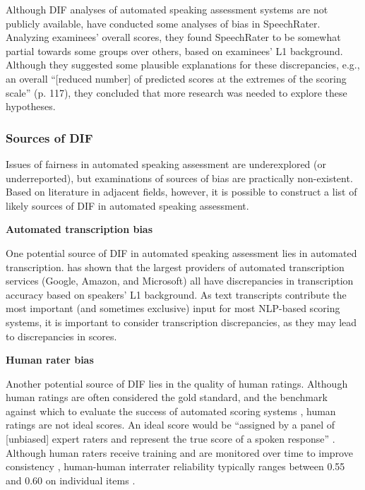 \documentclass [PhD] {uclathes}
\begin{document}
Although DIF analyses of automated speaking assessment systems are not publicly available, \citet{wang2018monitoring} have conducted some analyses of bias in SpeechRater. Analyzing examinees’ overall scores, they found SpeechRater to be somewhat partial towards some groups over others, based on examinees’ L1 background. Although they suggested some plausible explanations for these discrepancies, e.g., an overall “[reduced number] of predicted scores at the extremes of the scoring scale” (p. 117), they concluded that more research was needed to explore these hypotheses.

\subsubsection{Sources of DIF}

Issues of fairness in automated speaking assessment are underexplored (or underreported), but examinations of sources of bias are practically non-existent. Based on literature in adjacent fields, however, it is possible to construct a list of likely sources of DIF in automated speaking assessment. 

\noindent \textbf{Automated transcription bias} \;

One potential source of DIF in automated speaking assessment lies in automated transcription. \citet{dichristofano2023} has shown that the largest providers of automated transcription services (Google, Amazon, and Microsoft) all have discrepancies in transcription accuracy based on speakers’ L1 background. As text transcripts contribute the most important (and sometimes exclusive) input for most NLP-based scoring systems, it is important to consider transcription discrepancies, as they may lead to discrepancies in scores.

\noindent \textbf{Human rater bias} \;

Another potential source of DIF lies in the quality of human ratings. Although human ratings are often considered the gold standard, and the benchmark against which to evaluate the success of automated scoring systems \citep{zhang2019assessing}, human ratings are not ideal scores. An ideal score would be “assigned by a panel of [unbiased] expert raters and represent the true score of a spoken response” \citep{zechner2019summary}. Although human raters receive training and are monitored over time to improve consistency \citep{engelhard2002monitoring}, human-human interrater reliability typically ranges between 0.55 and 0.60 on individual items \citep{zechner2019summary}. 
\end{document}
